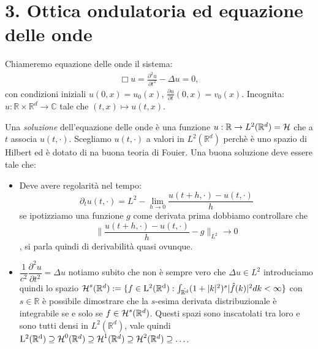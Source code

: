 \section*{3. Ottica ondulatoria ed equazione delle onde}

\begin{definition}
Chiameremo equazione delle onde il sistema: 
    \begin{align*}
        \Box u = \frac{\partial^2 u}{\partial t^2} - \Delta u = 0,
    \end{align*}
    con condizioni iniziali $u(0, x) = u_0(x)$, $\frac{\partial u}{\partial t}(0, x) = v_0(x)$.
Incognita: $u: \mathbb{R}\times \mathbb{R}^d \to \mathbb{C}$ tale che $(t,x) \mapsto u(t, x)$.
\end{definition}

Una \emph{soluzione} dell'equazione delle onde è una funzione $u: \mathbb{R} \to L^2(\mathbb{R}^d) = \operatorname{\mathcal{H}}$ che a $t$ associa $u(t, \cdot)$. Scegliamo $u(t, \cdot)$ a valori in $L^2(\mathbb{R}^d)$ perchè è uno spazio di Hilbert ed è dotato di na buona teoria di Fouier. Una buona soluzione deve essere tale che: 
\begin{itemize}
    \item Deve avere regolarità nel tempo: $$ \partial_t u(t, \cdot) = L^2 -\lim_{h \to 0} \frac{u(t+h, \cdot) - u(t, \cdot)}{h}$$ se ipotizziamo una funzione $g$ come derivata prima dobbiamo controllare che $$ \| \frac{u(t+h , \cdot )- u (t,\cdot)}{h} - g \|_{L^2} \to 0 $$, si parla quindi di derivabilità quasi ovunque.
    \item $\dfrac{1}{c^2}\dfrac{\partial^2 u}{\partial t^2} = \Delta u$ notiamo subito che non è sempre vero che $\Delta u \in L^2$ introduciamo quindi lo spazio $\operatorname{\mathcal{H}}^s(\mathbb{R}^d):= \{ f \in \operatorname{L^2(\mathbb{R}^d)} : \int_{\operatorname{\hat{\mathbb{R}^d}}}(1 + |k|^2)^s |\hat{f}(k)|^2 dk < \infty \}$ con $s \in \mathbb{R}$ è possibile dimostrare che la $s$-esima derivata distribuzionale è integrabile se e solo se $f \in \operatorname{\mathcal{H}}^s(\mathbb{R}^d)$. Questi spazi sono inscatolati tra loro e sono tutti densi in $L^2(\mathbb{R}^d)$, vale quindi $\operatorname{L^2(\mathbb{R}^d)} \supseteq \operatorname{\mathcal{H}}^0(\mathbb{R}^d) \supseteq \operatorname{\mathcal{H}}^1(\mathbb{R}^d) \supseteq \operatorname{\mathcal{H}}^2(\mathbb{R}^d) \supseteq \ldots$.
    
\end{itemize}




